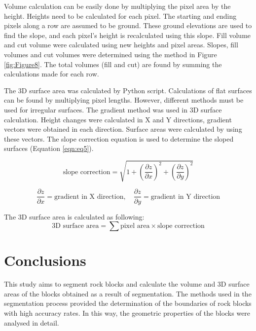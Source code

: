 \documentclass[a4paper,fleqn]{cas-sc}
\begin{document}
Volume calculation can be easily done by multiplying the pixel area by the height. Heights need to be calculated for each pixel. The starting and ending pixels along a row are assumed to be ground. These ground elevations are used to find the slope, and each pixel's height is recalculated using this slope. Fill volume and cut volume were calculated using new heights and pixel areas. Slopes, fill volumes and cut volumes were determined using the method in Figure \ref{fig:Figure8}. The total volumes (fill and cut) are found by summing the calculations made for each row.

The 3D surface area was calculated by Python script. Calculations of flat surfaces can be found by multiplying pixel lengths. However, different methods must be used for irregular surfaces. The gradient method was used in 3D surface calculation. Height changes were calculated in X and Y directions, gradient vectors were obtained in each direction. Surface areas were calculated by using these vectors. The slope correction equation is used to determine the sloped surfaces (Equation \ref{eqn:eq5}).

\begin{equation}
\label{eqn:eq5}
\text{slope correction} = \sqrt{1 + \left(\frac{\partial z}{\partial x}\right)^2 + \left(\frac{\partial z}{\partial y}\right)^2}
\end{equation}

\begin{equation}
\label{eqn:eq6}
\frac{\partial z}{\partial x} = \text{gradient in X direction}, \quad \frac{\partial z}{\partial y} = \text{gradient in Y direction}
\end{equation}

The 3D surface area is calculated as following:
\begin{equation}
\label{eqn:eq7}
\text{3D surface area} = \sum \text{pixel area} \times \text{slope correction}
\end{equation}


\section{Conclusions}

This study aims to segment rock blocks and calculate the volume and 3D surface areas of the blocks obtained as a result of segmentation. The methods used in the segmentation process provided the determination of the boundaries of rock blocks with high accuracy rates. In this way, the geometric properties of the blocks were analysed in detail.
\end{document}

